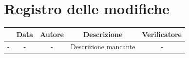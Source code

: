 \documentclass[11pt, a4paper]{article}
\begin{document}
\newpage

\section*{Registro delle modifiche}

\vspace{1cm}
\begin{center}
    \renewcommand{\arraystretch}{1.5}
    \begin{tabularx}{\textwidth}{|c|c|c|X|c|}
        \hline
        \rowcolor{gray!10} 
        \multicolumn{1}{|c|}{\textbf{Versione}} & 
        \multicolumn{1}{c|}{\textbf{Data}} & 
        \multicolumn{1}{c|}{\textbf{Autore}} & 
        \multicolumn{1}{c|}{\textbf{Descrizione}} & 
        \multicolumn{1}{c|}{\textbf{Verificatore}} \\
        \hline
        - & - & - & Descrizione mancante & - \\
        \hline
    \end{tabularx}
\end{center}
\vfill
\newpage

\tableofcontents
\newpage
\end{document}
